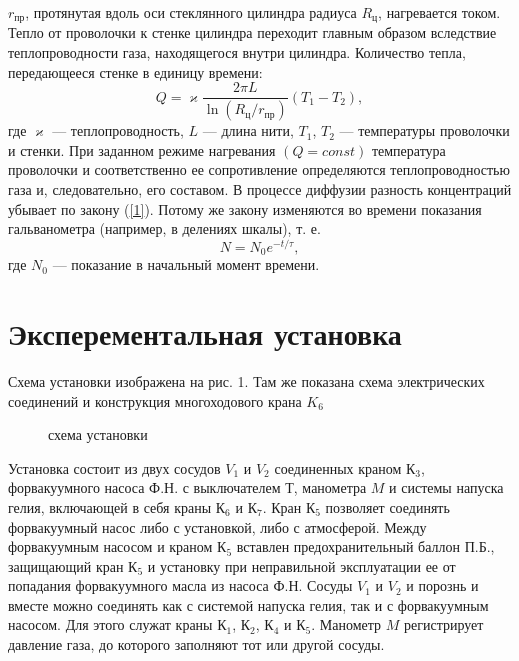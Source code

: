 \documentclass[a4paper, 12pt]{article}%
\begin{document}
$r_{\text{пр}}$, протянутая вдоль оси стеклянного цилиндра радиуса 
$R_{\text{ц}}$, нагревается током. Тепло от проволочки к стенке цилиндра
переходит главным образом вследствие теплопроводности газа, находящегося 
внутри цилиндра. Количество тепла, передающееся стенке
в единицу времени:
\[
	Q = \varkappa\frac{2\pi L}{\ln(R_{\text{ц}} / r_{\text{пр}} )}\left(T_1 - T_2 \right),
\]
где $\varkappa$ --- теплопроводность, $L$ --- длина нити, $T_1$, $T_2$ --- 
температуры проволочки и стенки. При заданном режиме нагревания $(Q = const)
$ температура проволочки и соответственно ее сопротивление определяются 
теплопроводностью газа и, следовательно, его составом. В процессе диффузии 
разность концентраций убывает по закону (\ref{1}). Потому же закону изменяются во времени показания гальванометра (например, в делениях шкалы), т. е.
\[
	N = N_0e^{-t/\tau},
\]
где $N_0$ --- показание в начальный момент времени.
\newpage
\section{Эксперементальная установка}
Схема установки изображена на рис. 1. Там же показана схема электрических соединений и конструкция многоходового крана $K_6$
\begin{figure}[h]
	\caption{схема установки}
\end{figure}
Установка состоит из двух сосудов $V_1$ и $V_2$ соединенных краном $К_3$, форвакуумного насоса Ф.Н. с выключателем $Т$, манометра $M$ и системы напуска гелия, включающей в себя краны $К_6$ и $К_7$. Кран $К_5$ позволяет соединять форвакуумный насос либо с установкой, либо с атмосферой. Между форвакуумным насосом и краном $К_5$ вставлен предохранительный баллон П.Б., защищающий кран $К_5$ и установку при неправильной эксплуатации ее от попадания форвакуумного масла из насоса Ф.Н. Сосуды $V_1$ и $V_2$ и порознь и вместе можно соединять как с системой напуска гелия, так и с форвакуумным насосом. Для этого служат краны $К_1$, $К_2$, $К_4$ и $К_5$. Манометр  $M$
регистрирует давление газа, до которого заполняют тот или другой
сосуды.
\end{document}
